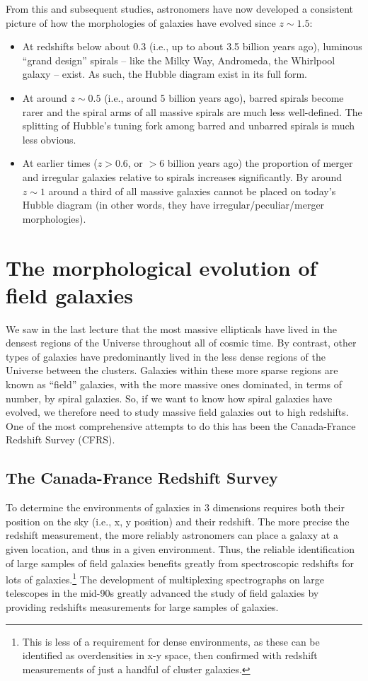\documentclass[11pt]{article}
\begin{document}
From this and subsequent studies, astronomers have now developed a
consistent picture of how the morphologies of galaxies have evolved
since $z\sim1.5$:
\begin{itemize}
\item At redshifts below about 0.3 (i.e., up to about 3.5 billion
  years ago), luminous ``grand design'' spirals -- like the Milky Way,
  Andromeda, the Whirlpool galaxy -- exist. As such, the Hubble
  diagram exist in its full form.
\item At around $z\sim0.5$ (i.e., around 5 billion years ago), barred
  spirals become rarer and the spiral arms of all massive spirals are
  much less well-defined. The splitting of Hubble's tuning fork among
  barred and unbarred spirals is much less obvious.
\item At earlier times ($z>0.6$, or $>6$ billion years ago) the
  proportion of merger and irregular galaxies relative to spirals
  increases significantly. By around $z\sim1$ around a third of all
  massive galaxies cannot be placed on today's Hubble diagram (in
  other words, they have irregular/peculiar/merger morphologies).
\end{itemize}

\section{The morphological evolution of field galaxies}
We saw in the last lecture that the most massive ellipticals have
lived in the densest regions of the Universe throughout all of cosmic
time. By contrast, other types of galaxies have predominantly lived in
the less dense regions of the Universe between the clusters. Galaxies
within these more sparse regions are known as ``field'' galaxies, with
the more massive ones dominated, in terms of number, by spiral
galaxies. So, if we want to know how spiral galaxies have evolved, we
therefore need to study massive field galaxies out to high
redshifts. One of the most comprehensive attempts to do this has been
the Canada-France Redshift Survey (CFRS).

\subsection{The Canada-France Redshift Survey}
To determine the environments of galaxies in 3 dimensions requires
both their position on the sky (i.e., x, y position) and their
redshift. The more precise the redshift measurement, the more reliably
astronomers can place a galaxy at a given location, and thus in a
given environment. Thus, the reliable identification of large samples
of field galaxies benefits greatly from spectroscopic redshifts for
lots of galaxies.\footnote{This is less of a requirement for dense
  environments, as these can be identified as overdensities in x-y
  space, then confirmed with redshift measurements of just a handful
  of cluster galaxies.} The development of multiplexing spectrographs
on large telescopes in the mid-90s greatly advanced the study of field
galaxies by providing redshifts measurements for large samples of
galaxies.
\end{document}
